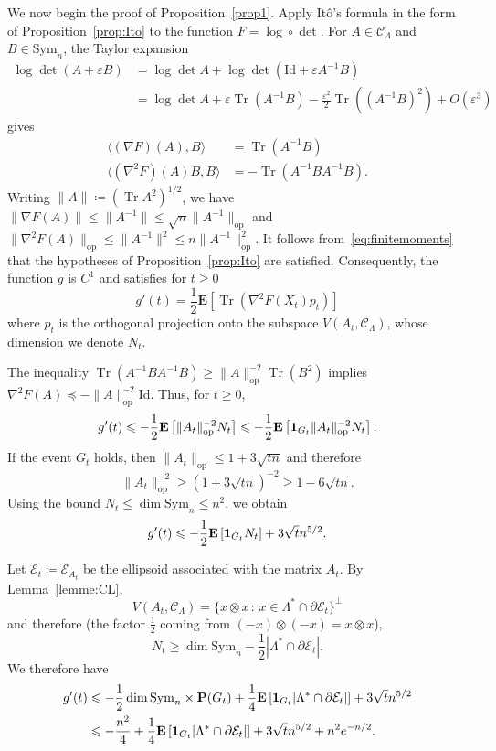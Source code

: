 \documentclass[12pt]{amsart}
\newcommand{\E}{\mathbf{E}}
\newcommand{\e}{\varepsilon}
\renewcommand{\P}{\mathbf{P}}
\newcommand{\Id}{\mathrm{Id}}
\newcommand{\Sym}{\mathrm{Sym}}
\DeclareMathOperator{\tr}{Tr}
\newcommand{\scalar}[2]{\langle #1 , #2\rangle}
\renewcommand{\leq}{\leqslant}
\renewcommand{\geq}{\geqslant}
\theoremstyle{plain}
\theoremstyle{remark}
\begin{document}
We now begin the proof of Proposition~\ref{prop1}.
Apply It\^o's formula in the form of Proposition~\ref{prop:Ito} to the function $F = \log \circ \det$. For $A \in \mathscr{C}_\Lambda$ and $B \in \Sym_n$, the Taylor expansion
\begin{align*} \log \det (A + \e B) & = \log  \det A + \log \det (\Id + \e A^{-1}B) \\
 &  = \log \det A + \e \tr(A^{-1}B) - \frac{\e^2}{2} \tr((A^{-1}B)^2) + O(\e^3)
 \end{align*}
 gives
 \begin{align*}
   \scalar{(\nabla F)(A)}{B} &= \tr (A^{-1}B) \\
 \scalar{(\nabla^2 F)(A)B}{B} &= - \tr (A^{-1}BA^{-1}B) .
 \end{align*}
 Writing $\|A\| \coloneqq (\tr A^2)^{1/2}$, we have $\| \nabla F (A)\| \leq \|A^{-1}\| \leq \sqrt{n} \|A^{-1}\|_{\mathrm{op}}$ and $\|\nabla^2 F(A)\|_{\mathrm{op}} \leq \|A^{-1}\|^2 \leq n \|A^{-1}\|^2_{\mathrm{op}}$. It follows from~\eqref{eq:finitemoments} that the hypotheses of Proposition~\ref{prop:Ito} are satisfied. Consequently, the function $g$ is $C^1$ and satisfies for $t\geq 0$
\[ g'(t) =
\frac{1}{2} \E \left[ \tr
(\nabla^2F(X_t) p_t ) \right] \]
where $p_t$ is the orthogonal projection onto the subspace $V(A_t,\mathscr{C}_\Lambda)$, whose dimension we denote $N_t$.
 
The inequality $\tr(A^{-1}BA^{-1}B) \geq \|A\|_{\mathrm{op}}^{-2} \tr(B^2)$ implies $\nabla^2F(A) \preccurlyeq - \|A\|_{\mathrm{op}}^{-2} \Id$. Thus, for $t \geq 0$,
\[
g'(t)   \leq  - \frac{1}{2} \E \left[ \|A_t\|_{\mathrm{op}}^{-2} N_t \right]  \leq - \frac{1}{2}  \E \left[ {\bf 1}_{G_t} \|A_t\|_{\mathrm{op}}^{-2} N_t \right] .
\]
If the event $G_t$ holds, then
$\|A_t\|_{\mathrm{op}} \leq 1 + 3 \sqrt{tn}$ and therefore
\[ \|A_t\|_{\mathrm{op}}^{-2} \geq (1 + 3 \sqrt{tn})^{-2} \geq 1 - 6 \sqrt{tn}. \]
Using the bound $N_t \leq \dim \Sym_n \leq n^2$, we obtain
\[
g'(t)  \leq  - \frac{1}{2} \E \left[ {\bf 1}_{G_t}  N_t \right] + 3 \sqrt{t} n^{5/2}.
\]
 
Let $\mathcal{E}_t \coloneqq  \mathcal{E}_{A_t}$ be the ellipsoid associated with the matrix $A_t$. By Lemma~\ref{lemme:CL},
\[ V(A_t,\mathscr{C}_\Lambda) = \{ x \otimes x \, : \, x \in \Lambda^* \cap \partial\mathcal{E}_t\}^\perp \]
and therefore (the factor $\frac{1}{2}$ coming from $(-x) \otimes (-x) = x \otimes x$),
\[ N_t  \geq \dim \Sym_n - \frac{1}{2} |\Lambda^* \cap \partial\mathcal{E}_t| .\]
We therefore have
\begin{align*}
 g'(t) & \leq  - \frac{1}{2} \dim \Sym_n \times \P(G_t) + \frac{1}{4} \E \left[ {\bf 1}_{G_t} |\Lambda^* \cap \partial\mathcal{E}_t| \right] + 3 \sqrt{t} n^{5/2} \\
 & \leq -\frac{n^2}{4} + \frac{1}{4} \E \left[ {\bf 1}_{G_t} |\Lambda^* \cap \partial\mathcal{E}_t| \right] + 3 \sqrt{t} n^{5/2} + n^2e^{-n/2} .
\end{align*}
 
\end{document}
